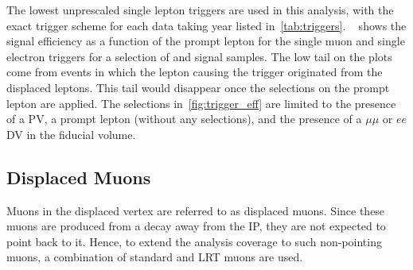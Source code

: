 The lowest unprescaled single lepton triggers are used in this analysis, with the exact trigger scheme for each data taking year listed in~\cref{tab:triggers}. ~ shows the signal efficiency as a function of the prompt lepton \pT for the single muon and single electron triggers for a selection of \uuu and \eee signal samples. The low \pT tail on the plots come from events in which the lepton causing the trigger originated from the displaced leptons. This tail would disappear once the selections on the prompt lepton are applied. The selections in~\cref{fig:trigger_eff} are limited to the presence of a PV, a prompt lepton (without any selections), and the presence of a $\mu\mu$ or $ee$ DV in the fiducial volume.

\subsection{Displaced Muons}
Muons in the displaced vertex are referred to as displaced muons. Since these muons are produced from a decay away from the IP, they are not expected to point back to it. Hence, to extend the analysis coverage to such non-pointing muons, a combination of standard and LRT muons are used.

